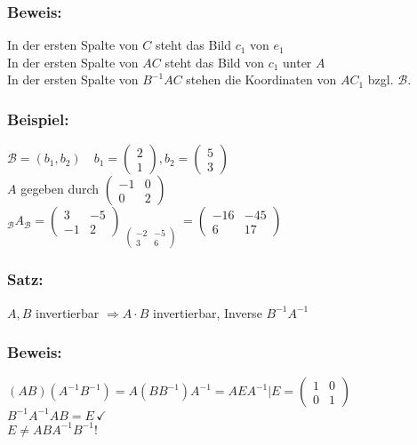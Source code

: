 \subsubsection{Beweis:}
In der ersten Spalte von $C$ steht das Bild $c_{1}$ von $e_{1}$\\
In der ersten Spalte von $AC$ steht das Bild von $c_{1}$ unter $A$\\
In der ersten Spalte von $B^{-1}AC$ stehen die Koordinaten von $AC_{1}$ bzgl. $\mathcal{B}$.
%
%
%
\subsubsection{Beispiel:}
$\mathcal{B}=(b_{1},b_{2}) \quad b_{1}=\begin{pmatrix} 2 \\ 1 \end{pmatrix}, b_{2}=\begin{pmatrix}5 \\ 3\end{pmatrix}$\\
$A$ gegeben durch $\begin{pmatrix} -1 & 0 \\ 0 & 2 \end{pmatrix}$\\
$_{\mathcal{B}}A_{\mathcal{B}}=\begin{pmatrix} 3 & -5 \\ -1 & 2 \end{pmatrix} \mathop{\underbrace{\begin{pmatrix} -1 & 0 \\ 0 & 2\end{pmatrix} \begin{pmatrix}2 & 5 \\ 1 & 3 \end{pmatrix}}}\limits_{\begin{pmatrix}-2 & -5 \\ 3 & 6 \end{pmatrix}}= \begin{pmatrix} -16 & -45 \\ 6 & 17\end{pmatrix}$
%
%
%
\subsubsection{Satz:}
$A,B$ invertierbar $\Rightarrow A \cdot B$ invertierbar, Inverse $B^{-1}A^{-1}$
%
%
%
\subsubsection{Beweis:}
$(AB)(A^{-1}B^{-1})=A(BB^{-1})A^{-1}=AEA^{-1}|E=\begin{pmatrix}1 & 0 \\ 0 &1 \end{pmatrix}$\\
$B^{-1}A^{-1}AB=E \, \checkmark$\\
$E \neq ABA^{-1}B^{-1}$!
%
%
%
